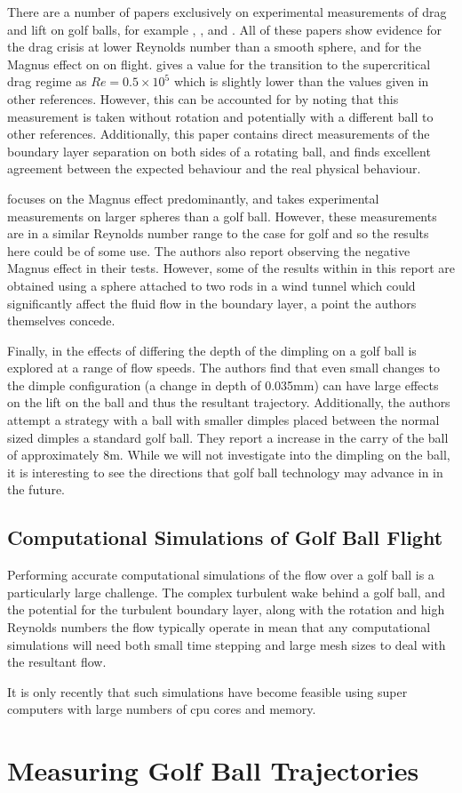 There are a number of papers exclusively on experimental measurements of drag and lift on golf balls, 
for example \citet{Kharlamov2007Magnus}, \citet{Naruo2014}, \citet{Kray2012} and \citet{Aoki2010}.
All of these papers show evidence for the drag crisis at lower Reynolds number than a smooth sphere,
and for the Magnus effect on on flight. \citet{Aoki2010} gives a value for the transition to the
supercritical drag regime as $Re = 0.5\times10^5$ which is slightly lower than the values given in
other references. However, this can be accounted for by noting that this measurement is taken without
rotation and potentially with a different ball to other references. Additionally, this paper contains
direct measurements of the boundary layer separation on both sides of a rotating ball, and finds 
excellent agreement between the expected behaviour and the real physical behaviour.

\citet{Kray2012} focuses on the Magnus effect predominantly, and takes experimental measurements on
larger spheres than a golf ball. However, these measurements are in a similar Reynolds number range
to the case for golf and so the results here could be of some use. The authors also report observing
the negative Magnus effect in their tests. However, some of the results within in this report are
obtained using a sphere attached to two rods in a wind tunnel which could significantly affect the fluid flow
in the boundary layer, a point the authors themselves concede.

Finally, in \citet{Naruo2014} the effects of differing the depth of the dimpling on a golf ball is 
explored at a range of flow speeds. The authors find that even small changes to the dimple configuration 
(a change in depth of 0.035mm)
can have large effects on the lift on the ball and thus the resultant trajectory. Additionally, the
authors attempt a strategy with a ball with smaller dimples placed between the normal sized dimples
a standard golf ball. They report a increase in the carry of the ball of approximately 8m. While we will not 
investigate into the dimpling on the ball, it is interesting to see the directions that golf ball
technology may advance in in the future.

\subsection{Computational Simulations of Golf Ball Flight}

Performing accurate computational simulations of the flow over a golf ball is a particularly large 
challenge. The complex turbulent wake behind a golf ball, and the potential for the turbulent boundary
layer, along with the rotation and high Reynolds numbers the flow typically operate in mean that any
computational simulations will need both small time stepping and large mesh sizes to deal with the 
resultant flow.

It is only recently that such simulations have become feasible using super computers with large numbers
of cpu cores and memory. 

\citet{Smith2010,Beratlis2012Numerical}

\section{Measuring Golf Ball Trajectories}

\citet{Martin2012}